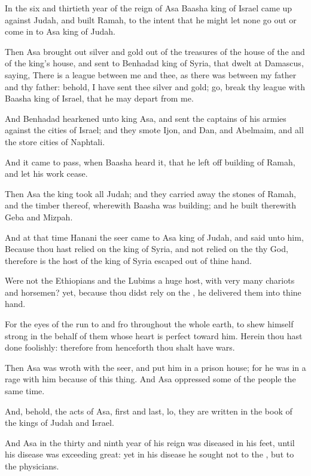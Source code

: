 \Chapter
\Verse In the six and thirtieth year of the reign of Asa Baasha king of Israel came up against Judah, and built Ramah, to the intent that he might let none go out or come in to Asa king of Judah.

\Verse Then Asa brought out silver and gold out of the treasures of the house of the \LORD and of the king's house, and sent to Benhadad king of Syria, that dwelt at Damascus, saying, \Verse There is a league between me and thee, as there was between my father and thy father: behold, I have sent thee silver and gold; go, break thy league with Baasha king of Israel, that he may depart from me.

\Verse And Benhadad hearkened unto king Asa, and sent the captains of his armies against the cities of Israel; and they smote Ijon, and Dan, and Abelmaim, and all the store cities of Naphtali.

\Verse And it came to pass, when Baasha heard it, that he left off building of Ramah, and let his work cease.

\Verse Then Asa the king took all Judah; and they carried away the stones of Ramah, and the timber thereof, wherewith Baasha was building; and he built therewith Geba and Mizpah.

\Verse And at that time Hanani the seer came to Asa king of Judah, and said unto him, Because thou hast relied on the king of Syria, and not relied on the \LORD thy God, therefore is the host of the king of Syria escaped out of thine hand.

\Verse Were not the Ethiopians and the Lubims a huge host, with very many chariots and horsemen? yet, because thou didst rely on the \LORD, he delivered them into thine hand.

\Verse For the eyes of the \LORD run to and fro throughout the whole earth, to shew himself strong in the behalf of them whose heart is perfect toward him. Herein thou hast done foolishly: therefore from henceforth thou shalt have wars.

\Verse Then Asa was wroth with the seer, and put him in a prison house; for he was in a rage with him because of this thing. And Asa oppressed some of the people the same time.

\Verse And, behold, the acts of Asa, first and last, lo, they are written in the book of the kings of Judah and Israel.

\Verse And Asa in the thirty and ninth year of his reign was diseased in his feet, until his disease was exceeding great: yet in his disease he sought not to the \LORD, but to the physicians.

